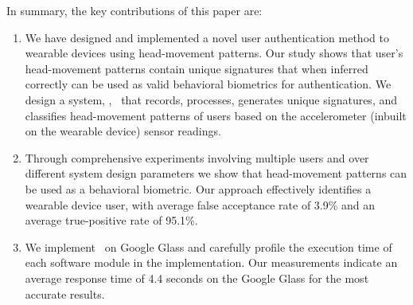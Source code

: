 
In summary, the key contributions of this paper are:

\begin{enumerate}

\item We have designed and implemented a novel user authentication method to wearable devices
using head-movement patterns. Our study shows that user's head-movement patterns
contain unique signatures that when inferred correctly can be used as valid
behavioral biometrics for authentication. We design a system, \systemname,~ 
that records, processes, generates unique signatures, and classifies 
head-movement patterns of users based on the accelerometer (inbuilt on the 
wearable device) sensor readings.


\item %
Through comprehensive experiments 
involving multiple users and over
different system design parameters we show that head-movement patterns
can be used as a behavioral biometric. 
Our approach effectively identifies a wearable device user, with average false 
acceptance rate of 3.9\% and an average true-positive rate of 95.1\%.

\item We implement \systemname~on Google Glass and carefully profile the 
execution time of each software module in the implementation. Our measurements 
indicate an average response time of 4.4 seconds on the Google Glass for the 
most accurate results.

\end{enumerate}

